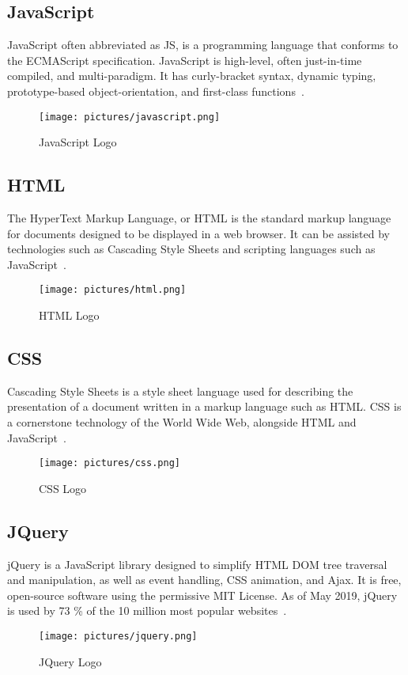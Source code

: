 \documentclass[12pt]{report}
\begin{document}
\subsection{JavaScript}
JavaScript often abbreviated as JS, is a programming language that conforms to the ECMAScript specification. JavaScript is high-level, often just-in-time compiled, and multi-paradigm. It has curly-bracket syntax, dynamic typing, prototype-based object-orientation, and first-class functions~\cite{crockford2008javascript}.
\begin{figure}[!htbp]

        \centering
    \texttt{[image: pictures/javascript.png]}
    \caption{JavaScript Logo}
    \label{fig:javascript}
\end{figure}
\subsection{HTML}
The HyperText Markup Language, or HTML is the standard markup language for documents designed to be displayed in a web browser. It can be assisted by technologies such as Cascading Style Sheets and scripting languages such as JavaScript~\cite{raggett1999html}.
\begin{figure}[!htbp]

        \centering
    \texttt{[image: pictures/html.png]}
    \caption{HTML Logo}
    \label{fig:html}
\end{figure}
\pagebreak
\subsection{CSS}
Cascading Style Sheets is a style sheet language used for describing the presentation of a document written in a markup language such as HTML. CSS is a cornerstone technology of the World Wide Web, alongside HTML and JavaScript~\cite{css}.
\begin{figure}[!htbp]

        \centering
    \texttt{[image: pictures/css.png]}
    \caption{CSS Logo}
    \label{fig:css}
\end{figure}
\subsection{JQuery}
jQuery is a JavaScript library designed to simplify HTML DOM tree traversal and manipulation, as well as event handling, CSS animation, and Ajax. It is free, open-source software using the permissive MIT License. As of May 2019, jQuery is used by 73 \% of the 10 million most popular websites~\cite{jquery}.
\begin{figure}[!htbp]

        \centering
    \texttt{[image: pictures/jquery.png]}
    \caption{JQuery Logo}
    \label{fig:jquery}
\end{figure}
\pagebreak
\end{document}
